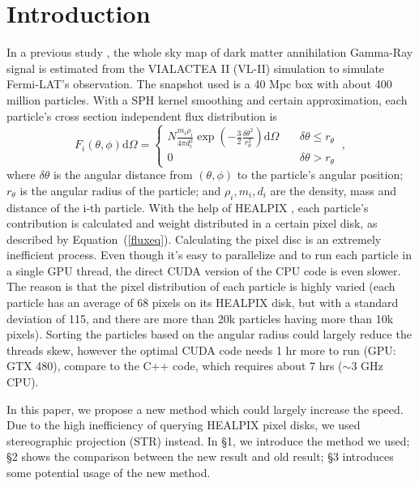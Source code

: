 \section*{Introduction}
In a previous study \citet{Kuhlen:2008kr}, the whole sky map of dark matter annihilation Gamma-Ray signal is estimated from the VIALACTEA II (VL-II) simulation to simulate Fermi-LAT's observation. The snapshot used is a 40 Mpc box with about 400 million particles. With a SPH kernel smoothing and certain approximation, each particle's cross section independent flux distribution is
\begin{equation}\label{fluxeq}
	F_i(\theta,\phi)\mathrm{d}\Omega = 
	\left\{\begin{aligned}
		N\frac{m_i\rho_i}{4\pi d_i^2} \exp\left(-\frac{3}2\frac{\delta\theta^2}{r_\theta^2}\right)\mathrm{d}\Omega  &\  & \delta\theta \le r_\theta \\
		0	&\   & \delta\theta > r_\theta\
	\end{aligned}\right. ,
\end{equation}
where $\delta\theta$ is the angular distance from $(\theta, \phi)$ to the particle's angular position; $r_\theta$ is the angular radius of the particle; and $\rho_i, m_i, d_i$ are the density, mass and distance of the i-th particle. With the help of HEALPIX \citep{Gorski:2005ku}, each particle's contribution is calculated and weight distributed in a certain pixel disk, as described by Equation~(\ref{fluxeq}). Calculating the pixel disc is an extremely inefficient process. Even though it's easy to parallelize and to run each particle in a single GPU thread, the direct CUDA version of the CPU code is even slower. The reason is that the pixel distribution of each particle is highly varied (each particle has an average of 68 pixels on its HEALPIX disk, but with a standard deviation of 115, and there are more than 20k particles having more than 10k pixels). Sorting the particles based on the angular radius could largely reduce the threads skew, however the optimal CUDA code needs 1 hr more to run (GPU: GTX 480), compare to the C++ code, which requires about 7 hrs ($\sim$3 GHz CPU). 
\ooindex{HEALPix, ascl:1107.018}

In this paper, we propose a new method which could largely increase the speed. Due to the high inefficiency of querying HEALPIX pixel disks, we used stereographic projection (STR) instead. In \S 1, we introduce the method we used; \S 2 shows the comparison between the new result and old result; \S 3 introduces some potential usage of the new method.


